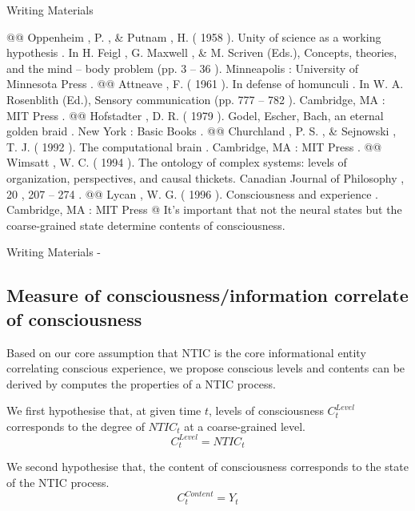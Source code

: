 \documentclass[utf8]{article}
\newenvironment{WritingMaterials} %
    	{
            \begin{tcolorbox}[enhanced,
                title=-,
                size=small,
                colbacktitle=Aquamarine,
                drop fuzzy shadow,
                fontupper=\small,
                boxrule=0.4pt,
                colback=Aquamarine!10!white,
                sharp corners]
                Writing Materials
            \end{tcolorbox}
            \begin{easylist}[itemize]
    	}
    	{
            \end{easylist}  
            \begin{tcolorbox}[enhanced,
                halign=flush right,
                halign title=right,
                size=small,
                colbacktitle=Aquamarine,
                drop fuzzy shadow,
                fontupper=\small,
                boxrule=0.4pt,
                colback=Aquamarine,
                colupper=White,
                sharp corners]
                Writing Materials -
            \end{tcolorbox}        
    	}
\newcommand{\rlstart}[1]{  %
        \setlength\changebarwidth{#1pt*2}  %
        \hspace*{-40pt}
        \cbstart{\textcolor{red}{\newline\textbf{iteration #1}}\newline}}
\newcommand{\rlend}{\cbend}
\begin{document}
\begin{WritingMaterials}
				@@ Oppenheim , P. , \& Putnam , H. ( 1958 ). Unity of science as a working hypothesis . In H. Feigl , G. Maxwell , \& M. Scriven (Eds.), Concepts, theories, and the mind – body problem (pp. 3 – 36 ). Minneapolis : University of Minnesota Press .
				@@ Attneave , F. ( 1961 ). In defense of homunculi . In W. A. Rosenblith (Ed.), Sensory communication (pp. 777 – 782 ). Cambridge, MA : MIT Press .
				@@ Hofstadter , D. R. ( 1979 ). Godel, Escher, Bach, an eternal golden braid . New York : Basic Books .
				@@ Churchland , P. S. , \& Sejnowski , T. J. ( 1992 ). The computational brain . Cambridge, MA : MIT Press .
				@@ Wimsatt , W. C. ( 1994 ). The ontology of complex systems: levels of organization, perspectives, and causal thickets. Canadian Journal of Philosophy , 20 , 207 – 274 .
				@@ Lycan ,  W. G.  ( 1996 ).  Consciousness and experience .  Cambridge, MA :  MIT Press
			@ It's important that not the neural states but the coarse-grained state determine contents of consciousness.

        

		\end{WritingMaterials}


\rlend







\rlstart{3}
		\subsection{Measure of consciousness/information correlate of consciousness}	
		Based on our core assumption that NTIC is the core informational entity correlating conscious experience, we propose conscious levels and contents can be derived by computes the properties of a NTIC process. \newline
		
		\noindent
		We first hypothesise that, at given time $t$, levels of consciousness $C_{t}^{Level}$ corresponds to the degree of  $NTIC_{t}$ at a coarse-grained level.
			\begin{equation}\label{eq:cLevel}
				C_{t}^{Level} = NTIC_{t}
			\end{equation}
		
		\newline
		\noindent 
		We second hypothesise that, the content of consciousness corresponds to the state of the NTIC process.
			\begin{equation}\label{eq:cContent}
				C_{t}^{Content} = Y_{t}
			\end{equation}
		
\end{document}
